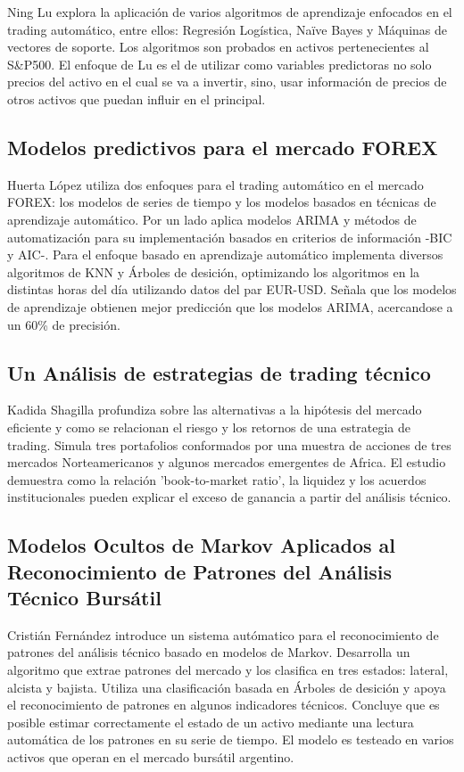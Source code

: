 \documentclass[a4paper,12pt]{Latex/Classes/PhDthesisPSnPDF}
\begin{document}
Ning Lu explora la aplicación de varios algoritmos de aprendizaje enfocados en el trading automático, entre ellos: Regresión Logística, Naïve Bayes y Máquinas de vectores de soporte. Los algoritmos son probados en activos pertenecientes al S\&P500. El enfoque de Lu es el de utilizar como variables predictoras no solo precios del activo en el cual se va a invertir, sino, usar información de precios de otros activos que puedan influir en el principal.

\subsection{Modelos predictivos para el mercado FOREX}

Huerta López utiliza dos enfoques para el trading automático en el mercado FOREX: los modelos de series de tiempo y los modelos basados en técnicas de aprendizaje automático. Por un lado aplica modelos ARIMA y métodos de automatización para su implementación basados en criterios de información -BIC y AIC-. Para el enfoque basado en aprendizaje automático implementa diversos algoritmos de KNN y Árboles de desición, optimizando los algoritmos en la distintas horas del día utilizando datos del par EUR-USD. Señala que los modelos de aprendizaje obtienen mejor predicción que los modelos ARIMA, acercandose a un 60\% de precisión.

\subsection{Un Análisis de estrategias de trading técnico}

Kadida Shagilla profundiza sobre las alternativas a la hipótesis del mercado eficiente y como se relacionan el riesgo y los retornos de una estrategia de trading. Simula tres portafolios conformados por una muestra de acciones de tres mercados Norteamericanos y algunos mercados emergentes de Africa. El estudio demuestra como la relación 'book-to-market ratio', la liquidez y los acuerdos institucionales pueden explicar el exceso de ganancia a partir del análisis técnico. 

\subsection{Modelos Ocultos de Markov Aplicados al Reconocimiento de Patrones del Análisis Técnico Bursátil}

Cristián Fernández introduce un sistema autómatico para el reconocimiento de patrones del análisis técnico basado en modelos de Markov. Desarrolla un algoritmo que extrae patrones del mercado y los clasifica en tres estados: lateral, alcista y bajista. Utiliza una clasificación basada en Árboles de desición y apoya el reconocimiento de patrones en algunos indicadores técnicos. Concluye que es posible estimar correctamente el estado de un activo mediante una lectura automática de los patrones en su serie de tiempo. El modelo es testeado en varios activos que operan en el mercado bursátil argentino.
\end{document}
